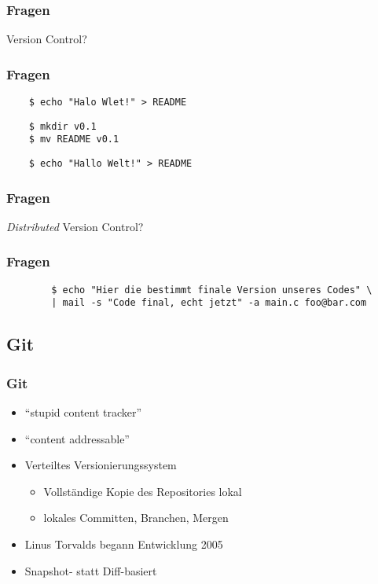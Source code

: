 \documentclass[]{beamer}
\begin{document}
\begin{frame}
	\frametitle{Fragen}
	\Huge{Version Control?}\\
\end{frame}

\begin{frame}[fragile]
	\frametitle{Fragen}
	\begin{verbatim}
	$ echo "Halo Wlet!" > README
	\end{verbatim}

	\begin{verbatim}
	$ mkdir v0.1
	$ mv README v0.1
	\end{verbatim}

	\begin{verbatim}
	$ echo "Hallo Welt!" > README
	\end{verbatim}
\end{frame}

\begin{frame}
	\frametitle{Fragen}
	\Huge{\emph{Distributed} Version Control?}
\end{frame}

\begin{frame}[fragile]
	\frametitle{Fragen}
	\begin{verbatim}
		$ echo "Hier die bestimmt finale Version unseres Codes" \ 
		| mail -s "Code final, echt jetzt" -a main.c foo@bar.com
	\end{verbatim}
\end{frame}

\subsection{Git}
\begin{frame}
	\frametitle{Git}
	\begin{itemize}
		\item
			``stupid content tracker''
		\item
			``content addressable''
		\item
			Verteiltes Versionierungssystem
			\begin{itemize}
				\item
					Vollständige Kopie des Repositories lokal
				\item
					lokales Committen, Branchen, Mergen
			\end{itemize}
		\item
			Linus Torvalds begann Entwicklung 2005
		\item
			Snapshot- statt Diff-basiert
	\end{itemize}
\end{frame}
\end{document}
